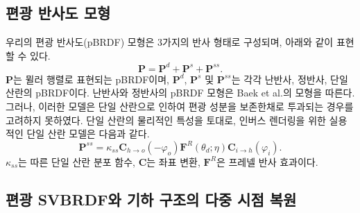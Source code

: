 \documentclass[a4paper,twocolumn]{article}
\begin{document}
\subsection{편광 반사도 모형}
\label{subsec:model}
우리의 편광 반사도(pBRDF) 모형은 3가지의 반사 형태로 구성되며, 아래와 같이 표현할 수 있다.
\begin{equation}
	\label{eq:diffuse_and_specular}
	\mathbf{P}={{\mathbf{P}}^{d}}+{{\mathbf{P}}^{s}}+{{\mathbf{P}}^{ss}}.
\end{equation}
${\mathbf{P}}$는 뮐러 행렬로 표현되는 pBRDF이며,  ${\mathbf{P}}^{d}$, ${\mathbf{P}}^{s}$ 및 ${\mathbf{P}}^{ss}$는 각각 난반사, 정반사, 단일 산란의 pBRDF이다.
난반사와 정반사의 pBRDF 모형은 Baek et al.\cite{Baek2018}의 모형을 따른다.
그러나, 이러한 모델은 단일 산란으로 인하여 편광 성분을 보존한채로 투과되는 경우를 고려하지 못하였다. 
단일 산란의 물리적인 특성을 토대로, 인버스 렌더링을 위한 실용적인 단일 산란 모델은 다음과 같다. 
\begin{equation}
	\label{eq:single_scattering_transport}
	{{\mathbf{P}}^{ss}}= {{\kappa}_{ss}} {{\mathbf{C}}_{h\to o}}\left(-{\varphi_{o}} \right){{\mathbf{F}}^{R}}\left( {{\theta }_{d}};\eta  \right){{\mathbf{C}}_{i\to h}}\left({\varphi_{i}} \right).
\end{equation}
%
$\kappa_{ss}$는 따른 단일 산란 분포 함수, $\mathbf{C}$는 좌표 변환, $\mathbf{F}^{R}$은 프레넬 반사 효과이다.


\subsection{편광 SVBRDF와 기하 구조의 다중 시점 복원}
\label{subsec:reconstruction}
\end{document}
